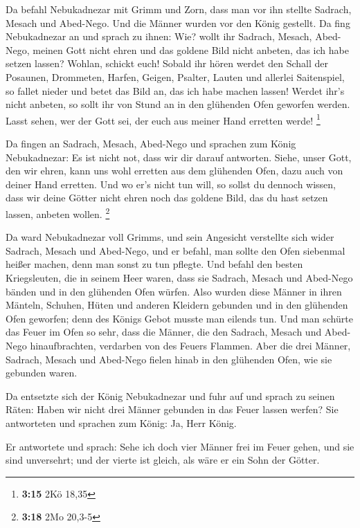  Da befahl Nebukadnezar mit Grimm und Zorn, dass man vor
ihn stellte Sadrach, Mesach und Abed-Nego. Und die Männer wurden vor den
König gestellt.  Da fing Nebukadnezar an und sprach zu
ihnen: Wie? wollt ihr Sadrach, Mesach, Abed-Nego, meinen Gott nicht
ehren und das goldene Bild nicht anbeten, das ich habe setzen lassen?
 Wohlan, schickt euch! Sobald ihr hören werdet den Schall
der Posaunen, Drommeten, Harfen, Geigen, Psalter, Lauten und allerlei
Saitenspiel, so fallet nieder und betet das Bild an, das ich habe machen
lassen! Werdet ihr's nicht anbeten, so sollt ihr von Stund an in den
glühenden Ofen geworfen werden. Lasst sehen, wer der Gott sei, der euch
aus meiner Hand erretten werde! \footnote{\textbf{3:15} 2Kö 18,35}

 Da fingen an Sadrach, Mesach, Abed-Nego und sprachen zum
König Nebukadnezar: Es ist nicht not, dass wir dir darauf antworten.
 Siehe, unser Gott, den wir ehren, kann uns wohl erretten
aus dem glühenden Ofen, dazu auch von deiner Hand erretten.
 Und wo er's nicht tun will, so sollst du dennoch wissen,
dass wir deine Götter nicht ehren noch das goldene Bild, das du hast
setzen lassen, anbeten wollen. \footnote{\textbf{3:18} 2Mo 20,3-5}

 Da ward Nebukadnezar voll Grimms, und sein Angesicht
verstellte sich wider Sadrach, Mesach und Abed-Nego, und er befahl, man
sollte den Ofen siebenmal heißer machen, denn man sonst zu tun pflegte.
 Und befahl den besten Kriegsleuten, die in seinem Heer
waren, dass sie Sadrach, Mesach und Abed-Nego bänden und in den
glühenden Ofen würfen.  Also wurden diese Männer in ihren
Mänteln, Schuhen, Hüten und anderen Kleidern gebunden und in den
glühenden Ofen geworfen;  denn des Königs Gebot musste
man eilends tun. Und man schürte das Feuer im Ofen so sehr, dass die
Männer, die den Sadrach, Mesach und Abed-Nego hinaufbrachten, verdarben
von des Feuers Flammen.  Aber die drei Männer, Sadrach,
Mesach und Abed-Nego fielen hinab in den glühenden Ofen, wie sie
gebunden waren.

 Da entsetzte sich der König Nebukadnezar und fuhr auf
und sprach zu seinen Räten: Haben wir nicht drei Männer gebunden in das
Feuer lassen werfen? Sie antworteten und sprachen zum König: Ja, Herr
König.

 Er antwortete und sprach: Sehe ich doch vier Männer frei
im Feuer gehen, und sie sind unversehrt; und der vierte ist gleich, als
wäre er ein Sohn der Götter.

